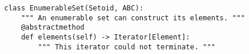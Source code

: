 \par\begin{minipage}{60ex}
\begin{verbatim}
class EnumerableSet(Setoid, ABC):
    """ An enumerable set can construct its elements. """
    @abstractmethod
    def elements(self) -> Iterator[Element]:
        """ This iterator could not terminate. """
\end{verbatim}
\end{minipage}\par
